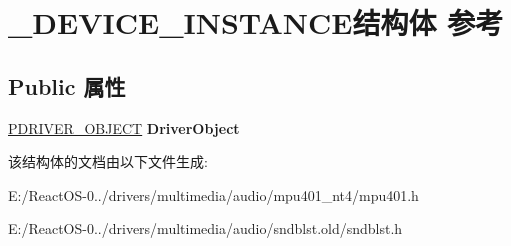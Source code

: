 \hypertarget{struct___d_e_v_i_c_e___i_n_s_t_a_n_c_e}{}\section{\+\_\+\+D\+E\+V\+I\+C\+E\+\_\+\+I\+N\+S\+T\+A\+N\+C\+E结构体 参考}
\label{struct___d_e_v_i_c_e___i_n_s_t_a_n_c_e}
\subsection*{Public 属性}
\begin{DoxyCompactItemize}
\item 
\mbox{\label{struct___d_e_v_i_c_e___i_n_s_t_a_n_c_e_abf0eaf82f818963e8a7a6af8deb70893}} 
\hyperlink{struct___d_r_i_v_e_r___o_b_j_e_c_t}{P\+D\+R\+I\+V\+E\+R\+\_\+\+O\+B\+J\+E\+CT} {\bfseries Driver\+Object}
\end{DoxyCompactItemize}


该结构体的文档由以下文件生成\+:\begin{DoxyCompactItemize}
\item 
E\+:/\+React\+O\+S-\/0../drivers/multimedia/audio/mpu401\+\_\+nt4/mpu401.\+h\item 
E\+:/\+React\+O\+S-\/0../drivers/multimedia/audio/sndblst.\+old/sndblst.\+h\end{DoxyCompactItemize}
